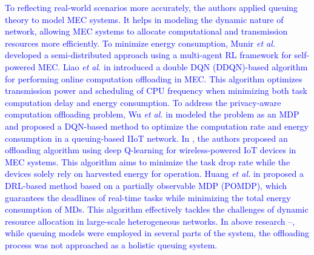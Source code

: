 \documentclass[12pt,draftclsnofoot,onecolumn]{IEEEtran}
\begin{document}
	\textcolor{blue}{To reflecting real-world scenarios more accurately, the authors applied queuing theory to model MEC systems. It helps in modeling the dynamic nature of network, allowing MEC systems to allocate computational and transmission resources more efficiently.
		To minimize energy consumption, Munir \textit{et al.} \cite{munir2021multi} developed a semi-distributed approach using a multi-agent RL framework for self-powered MEC. 
		Liao \textit{et al.} in \cite{liao2023online} introduced a double DQN (DDQN)-based algorithm for performing online computation offloading in MEC. This algorithm optimizes transmission power and scheduling of CPU frequency when minimizing both task computation delay and energy consumption. 
		To address the privacy-aware computation offloading problem, Wu \textit{et al.} in \cite{wu2024combining} modeled the problem as an MDP and proposed a DQN-based method to optimize the computation rate and energy consumption in a queuing-based IIoT network.
		In \cite{Bolourian-WCL24}, the authors proposed an offloading algorithm using deep Q-learning for wireless-powered IoT devices in MEC systems. This algorithm aims to minimize the task drop rate while the devices solely rely on harvested energy for operation. 
		Huang \textit{et al.} in \cite{huang2021deadline} proposed a DRL-based method based on a partially observable MDP (POMDP), which guarantees the deadlines of real-time tasks while minimizing the total energy consumption of MDs. This algorithm effectively tackles the challenges of dynamic resource allocation in large-scale heterogeneous networks.
		In above research \cite{munir2021multi}--\cite{huang2021deadline}, while queuing models were employed in several parts of the system, the offloading process was not approached as a holistic queuing system. }
	
	
	
	
	
\end{document}
